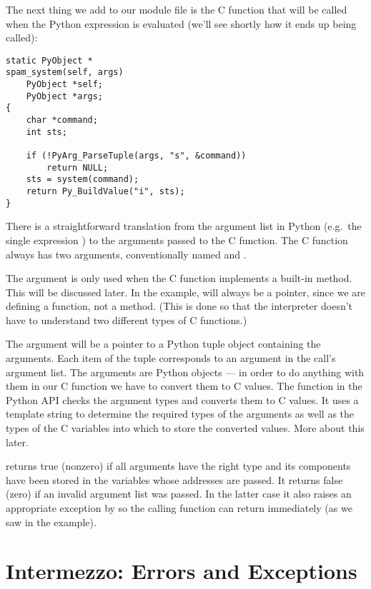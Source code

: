 \documentclass{manual}
\begin{document}
The next thing we add to our module file is the C function that will
be called when the Python expression 
is evaluated (we'll see shortly how it ends up being called):

\begin{verbatim}
static PyObject *
spam_system(self, args)
    PyObject *self;
    PyObject *args;
{
    char *command;
    int sts;

    if (!PyArg_ParseTuple(args, "s", &command))
        return NULL;
    sts = system(command);
    return Py_BuildValue("i", sts);
}
\end{verbatim}

There is a straightforward translation from the argument list in
Python (e.g.\ the single expression ) to the arguments
passed to the C function.  The C function always has two arguments,
conventionally named  and .

The  argument is only used when the C function implements a
built-in method.  This will be discussed later. In the example,
 will always be a \NULL{} pointer, since we are defining
a function, not a method.  (This is done so that the interpreter
doesn't have to understand two different types of C functions.)

The  argument will be a pointer to a Python tuple object
containing the arguments.  Each item of the tuple corresponds to an
argument in the call's argument list.  The arguments are Python
objects --- in order to do anything with them in our C function we have
to convert them to C values.  The function 
in the Python API checks the argument types and converts them to C
values.  It uses a template string to determine the required types of
the arguments as well as the types of the C variables into which to
store the converted values.  More about this later.

 returns true (nonzero) if all arguments have
the right type and its components have been stored in the variables
whose addresses are passed.  It returns false (zero) if an invalid
argument list was passed.  In the latter case it also raises an
appropriate exception by so the calling function can return
\NULL{} immediately (as we saw in the example).


\section{Intermezzo: Errors and Exceptions
         \label{errors}}
\end{document}
